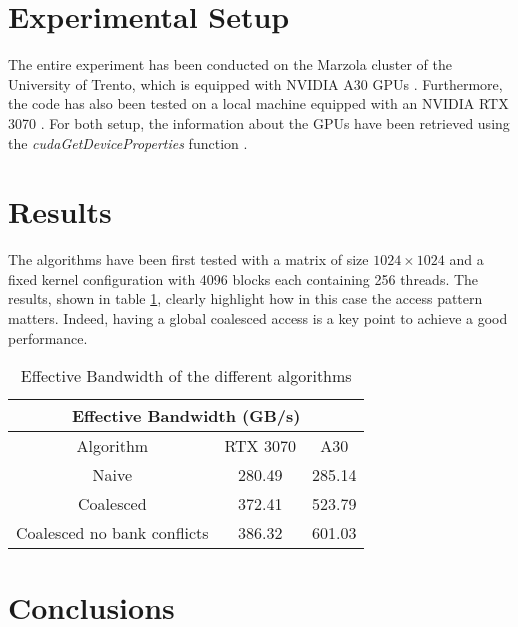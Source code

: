 \documentclass[]{IEEEconf}
\begin{document}
\section{Experimental Setup}
The entire experiment has been conducted on the Marzola cluster of the University of Trento, 
which is equipped with NVIDIA A30 GPUs \cite{nvidia:a30}.
Furthermore, the code has also been tested on a local machine equipped with an NVIDIA RTX 3070 \cite{nvidia:rtx3070}.
For both setup, the information about the GPUs have been retrieved using the \textit{cudaGetDeviceProperties} function \cite{nvidia:cudaDeviceProp}.
\section{Results}
The algorithms have been first tested with a matrix of size $1024 \times 1024$ and a fixed kernel configuration with 4096 blocks each containing 256 threads.
The results, shown in table \ref{tab:bandwidth}, clearly highlight how in this case the access pattern matters. Indeed, having a global coalesced access is a key
point to achieve a good performance.
\begin{table}
    \centering
    \begin{tabular}{|c|c|c|}
        \hline
        \multicolumn{3}{|c|}{\textbf{Effective Bandwidth (GB/s)}} \\
        \hline
        Algorithm & RTX 3070 & A30 \\ \hline
        Naive     & 280.49   & 285.14 \\ \hline
        Coalesced & 372.41   & 523.79 \\ \hline
        Coalesced no bank conflicts & 386.32 & 601.03 \\ \hline
    \end{tabular}
    \caption{Effective Bandwidth of the different algorithms}
    \label{tab:bandwidth}
\end{table}
\section{Conclusions}



\end{document}
